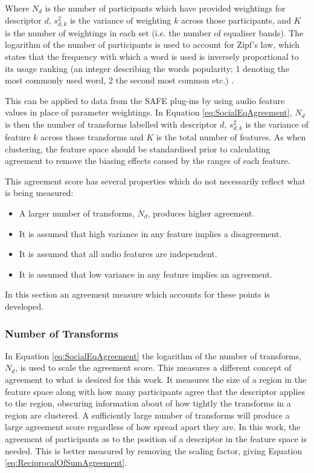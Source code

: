 		Where $N_{d}$ is the number of participants which have provided weightings for descriptor $d$,
		$s_{d,k}^{2}$ is the variance of weighting $k$ across those participants, and $K$ is the number of
		weightings in each set (i.e. the number of equaliser bands). The logarithm of the number of
		participants is used to account for Zipf's law, which states that the frequency with which a word is used
		is inversely proportional to its usage ranking (an integer describing the words popularity; 1 denoting the
		most commonly used word, 2 the second most common etc.) \citep{manning1999foundations}.

		This can be applied to data from the SAFE plug-ins by using audio feature values in place of parameter
		weightings. In Equation \ref{eq:SocialEqAgreement}, $N_{d}$ is then the number of transforms labelled with
		descriptor $d$, $s_{d,k}^{2}$ is the variance of feature $k$ across those transforms and $K$ is the total
		number of features. As when clustering, the feature space should be standardised prior to calculating
		agreement to remove the biasing effects caused by the ranges of each feature.

		This agreement score has several properties which do not necessarily reflect what is being measured:

		\begin{itemize}
			\item A larger number of transforms, $N_{d}$, produces higher agreement.
			\item It is assumed that high variance in any feature implies a disagreement. 
			\item It is assumed that all audio features are independent. 
			\item It is assumed that low variance in any feature implies an agreement. 
		\end{itemize}

		In this section an agreement measure which accounts for these points is developed.

		\subsubsection*{Number of Transforms}
			In Equation \ref{eq:SocialEqAgreement} the logarithm of the number of transforms, $N_{d}$, is used
			to scale the agreement score. This measures a different concept of agreement to what is desired for
			this work. It measures the size of a region in the feature space along with how many participants
			agree that the descriptor applies to the region, obscuring information about of how tightly the
			transforms in a region are clustered. A sufficiently large number of transforms will produce a
			large agreement score regardless of how spread apart they are. In this work, the agreement of
			participants as to the position of a descriptor in the feature space is needed. This is better
			measured by removing the scaling factor, giving Equation \ref{eq:ReciprocalOfSumAgreement}.

